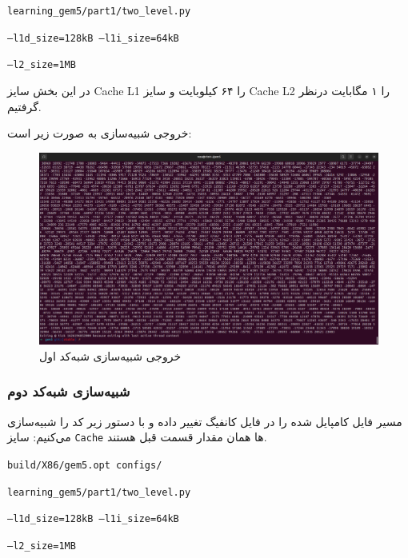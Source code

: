 \documentclass[12pt]{exam}
\begin{document}
\begin{multicols}{1}
\begin{latin}
	  	\texttt{learning\_gem5/part1/two\_level.py}
	  	
	  	\texttt{--l1d\_size=128kB --l1i\_size=64kB}
	  	
	  	\texttt{--l2\_size=1MB}
	  \end{latin}
	  
	  در این بخش سایز Cache L1 را ۶۴ کیلوبایت و سایز Cache L2 را ۱ مگابایت درنظر گرفتیم.
	  
	  خروجی شبیه‌سازی به صورت زیر است:
	  \begin{center}
	  	\begin{figure}[H]
	  		\includegraphics[scale=0.12]{images/img9.png}
	  		\caption{خروجی شبیه‌سازی شبه‌کد اول}
	  		\label{خروجی شبیه‌سازی شبه‌کد اول}
	  	\end{figure}
	  \end{center}
	  
	  
	  
	
	
	\subsubsection{شبیه‌سازی شبه‌کد دوم}
	مسیر فایل کامپایل شده را در فایل کانفیگ تغییر داده و با دستور زیر کد را شبیه‌سازی می‌کنیم:
	سایز \texttt{Cache} ها همان مقدار قسمت قبل هستند.
	\begin{latin}
		\texttt{build/X86/gem5.opt configs/}
		
		\texttt{learning\_gem5/part1/two\_level.py}
		
		\texttt{--l1d\_size=128kB --l1i\_size=64kB}
		
		\texttt{--l2\_size=1MB}
	\end{latin}
	

\end{multicols}
\end{document}
